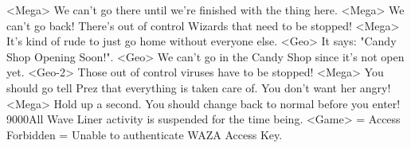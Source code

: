<Mega> We can't go there until we're finished with the thing here. 
<Mega> We can't go back! There's out of control Wizards that need to be stopped! 
<Mega> It's kind of rude to just go home without everyone else. 
<Geo> It says: "Candy Shop Opening Soon!". 
<Geo> We can't go in the Candy Shop since it's not open yet. 
<Geo-2> Those out of control viruses have to be stopped! 
<Mega> You should go tell Prez that everything is taken care of. You don't want her angry! 
<Mega> Hold up a second. You should change back to normal before you enter! 
{90}{00}All Wave Liner activity is suspended for the time being. 
<Game> = Access Forbidden = Unable to authenticate WAZA Access Key. 
